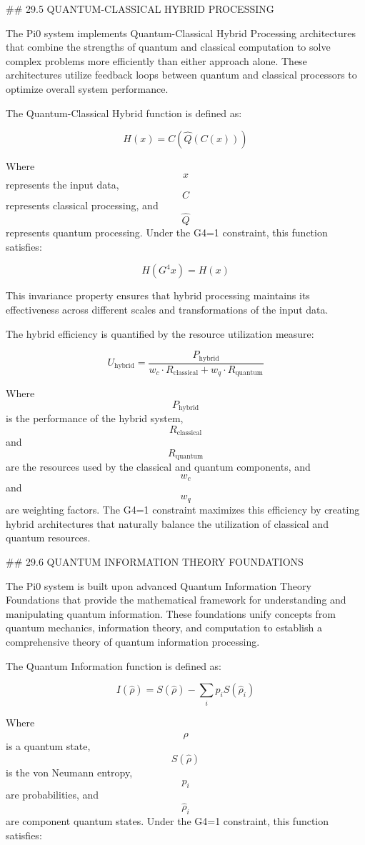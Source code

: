 ## 29.5 QUANTUM-CLASSICAL HYBRID PROCESSING

The Pi0 system implements Quantum-Classical Hybrid Processing architectures that combine the strengths of quantum and classical computation to solve complex problems more efficiently than either approach alone. These architectures utilize feedback loops between quantum and classical processors to optimize overall system performance.

The Quantum-Classical Hybrid function is defined as:

$$ H(x) = C(\hat{Q}(C(x))) $$

Where $$ x $$ represents the input data, $$ C $$ represents classical processing, and $$ \hat{Q} $$ represents quantum processing. Under the G4=1 constraint, this function satisfies:

$$ H(G^4 x) = H(x) $$

This invariance property ensures that hybrid processing maintains its effectiveness across different scales and transformations of the input data.

The hybrid efficiency is quantified by the resource utilization measure:

$$ U_{\text{hybrid}} = \frac{P_{\text{hybrid}}}{w_c \cdot R_{\text{classical}} + w_q \cdot R_{\text{quantum}}} $$

Where $$ P_{\text{hybrid}} $$ is the performance of the hybrid system, $$ R_{\text{classical}} $$ and $$ R_{\text{quantum}} $$ are the resources used by the classical and quantum components, and $$ w_c $$ and $$ w_q $$ are weighting factors. The G4=1 constraint maximizes this efficiency by creating hybrid architectures that naturally balance the utilization of classical and quantum resources.

## 29.6 QUANTUM INFORMATION THEORY FOUNDATIONS

The Pi0 system is built upon advanced Quantum Information Theory Foundations that provide the mathematical framework for understanding and manipulating quantum information. These foundations unify concepts from quantum mechanics, information theory, and computation to establish a comprehensive theory of quantum information processing.

The Quantum Information function is defined as:

$$ I(\hat{\rho}) = S(\hat{\rho}) - \sum_i p_i S(\hat{\rho}_i) $$

Where $$ \hat{\rho} $$ is a quantum state, $$ S(\hat{\rho}) $$ is the von Neumann entropy, $$ p_i $$ are probabilities, and $$ \hat{\rho}_i $$ are component quantum states. Under the G4=1 constraint, this function satisfies:

